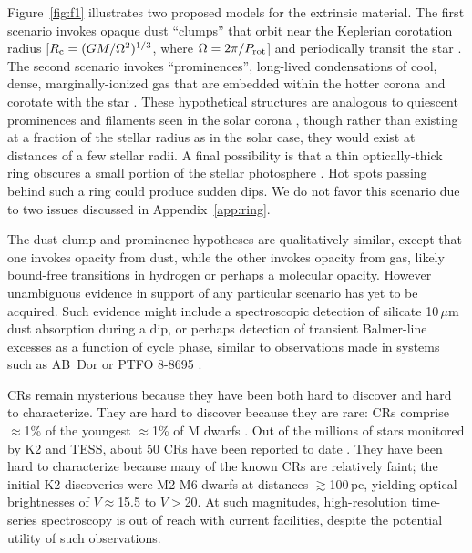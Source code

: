 \documentclass[11pt,twocolumn,tighten]{aastex63}
\begin{document}
Figure~\ref{fig:f1} illustrates two proposed models for the extrinsic
material.  The first scenario invokes opaque dust ``clumps'' that
orbit near the Keplerian corotation radius [$R_{\rm c} =
(GM/\Omega^2)^{1/3}$, where $\Omega = 2\pi/P_{\rm rot}$] and
periodically transit the star
\citep{2017AJ....153..152S,2023MNRAS.518.4734S}.  The second scenario
invokes ``prominences'', long-lived condensations of cool, dense,
marginally-ionized gas that are embedded within the hotter corona and
corotate with the star
\citep{1989MNRAS.238..657C,2019MNRAS.482.2853J,2022MNRAS.514.5465W}.
These hypothetical structures are analogous to quiescent prominences
and filaments seen in the solar corona \citep[see
e.g.][]{2015ASSL..415.....V}, though rather than existing at a
fraction of the stellar radius as in the solar case, they would exist
at distances of a few stellar radii.  A final possibility is that a
thin optically-thick ring obscures a small portion of the stellar
photosphere \citep{2019ApJ...876..127Z}.  Hot spots passing behind
such a ring could produce sudden dips.  We do not favor this scenario
due to two issues discussed in Appendix~\ref{app:ring}.

The dust clump and prominence hypotheses are qualitatively similar,
except that one invokes opacity from dust, while the other invokes
opacity from gas, likely bound-free transitions in hydrogen or perhaps
a molecular opacity.  However unambiguous evidence in support of any
particular scenario has yet to be acquired.  Such evidence might
include a spectroscopic detection of silicate 10\,$\mu$m dust
absorption during a dip, or perhaps detection of transient Balmer-line
excesses as a function of cycle phase, similar to observations made in
systems such as AB~Dor \citep[see][]{1999ASPC..158..146C} or PTFO
8-8695 \citep{2016ApJ...830...15J}.

CRs remain mysterious because they have been both hard to discover and
hard to characterize.   They are hard to discover because they are
rare: CRs comprise $\approx$1\% of the youngest $\approx$1\% of M
dwarfs \citep{2018AJ....155..196R}.  Out of the millions of stars
monitored by K2 and TESS, about 50 CRs have been reported to date
\citep{2016AJ....152..114R,2017AJ....153..152S,2018AJ....155...63S,2019ApJ...876..127Z,2020AJ....160...86B,2022AJ....163..144G,2023ApJ...945..114P}.
They have been hard to characterize because many of the known CRs are
relatively faint; the initial K2 discoveries
\citep{2016AJ....152..114R,2017AJ....153..152S} were M2-M6 dwarfs at
distances $\gtrsim$100\,pc, yielding optical brightnesses of
$V$$\approx$15.5 to $V$$>$20.  At such magnitudes, high-resolution
time-series spectroscopy is out of reach with current facilities,
despite the potential utility of such observations.
\end{document}
